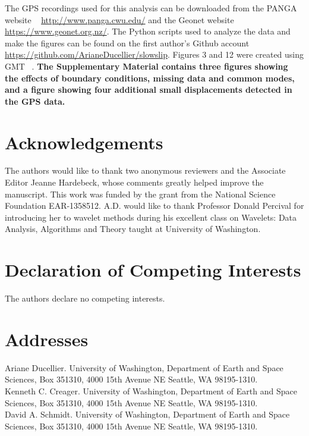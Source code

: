 \documentclass{article}
\begin{document}
The GPS recordings used for this analysis can be downloaded from the PANGA website ~\citep{PANGA} \url{http://www.panga.cwu.edu/} and the Geonet website \url{https://www.geonet.org.nz/}. The Python scripts used to analyze the data and make the figures can be found on the first author's Github account \url{https://github.com/ArianeDucellier/slowslip}. Figures 3 and 12 were created using GMT ~\citep{WES_1991}. \textbf{The Supplementary Material contains three figures showing the effects of boundary conditions, missing data and common modes, and a figure showing four additional small displacements detected in the GPS data.}

\section*{Acknowledgements}

The authors would like to thank two anonymous reviewers and the Associate Editor Jeanne Hardebeck, whose comments greatly helped improve the manuscript. This work was funded by the grant from the National Science Foundation EAR-1358512. A.D. would like to thank Professor Donald Percival for introducing her to wavelet methods during his excellent class on Wavelets: Data Analysis, Algorithms and Theory taught at University of Washington.   

\section*{Declaration of Competing Interests}

The authors declare no competing interests.




\newpage

\section*{Addresses}

Ariane Ducellier. University of Washington, Department of Earth and Space Sciences, Box 351310, 4000 15th Avenue NE Seattle, WA 98195-1310. \\

Kenneth C. Creager. University of Washington, Department of Earth and Space Sciences, Box 351310, 4000 15th Avenue NE Seattle, WA 98195-1310. \\

David A. Schmidt. University of Washington, Department of Earth and Space Sciences, Box 351310, 4000 15th Avenue NE Seattle, WA 98195-1310.
\end{document}
